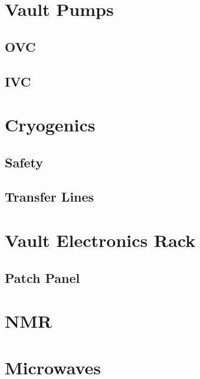 \section{Vault Pumps}
  \subsection{OVC}
  \subsection{IVC}

\section{Cryogenics}
  \subsection{Safety}
  \subsection{Transfer Lines}

\section{Vault Electronics Rack}
  \subsection{Patch Panel}
  \subsection{}

\section{NMR}

\section{Microwaves}